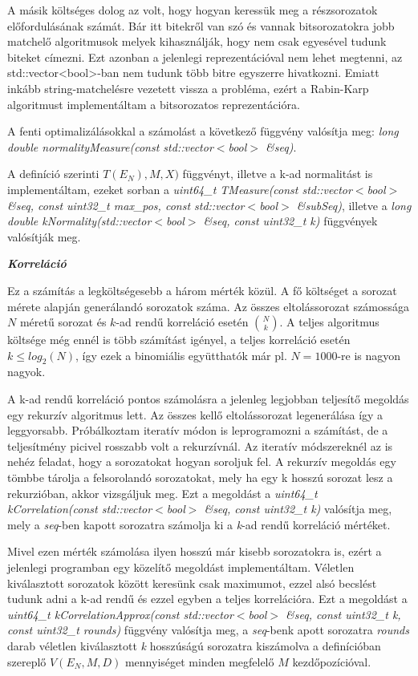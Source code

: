 \documentclass[12pt]{article}
\begin{document}
A másik költséges dolog az volt, hogy hogyan keressük meg a részsorozatok előfordulásának számát. Bár itt bitekről van szó és vannak bitsorozatokra jobb matchelő algoritmusok melyek kihasználják, hogy nem csak egyesével tudunk biteket címezni. Ezt azonban a jelenlegi reprezentációval nem lehet megtenni, az std::vector<bool>-ban nem tudunk több bitre egyszerre hivatkozni. Emiatt inkább string-matchelésre vezetett vissza a probléma, ezért a Rabin-Karp algoritmust implementáltam a bitsorozatos reprezentációra.

A fenti optimalizálásokkal a számolást a következő függvény valósítja meg: \textit{long double normalityMeasure(const std::vector$<$bool$>$ \&seq)}.

A definíció szerinti $T(E_N), M, X)$ függvényt, illetve a k-ad normalitást is implementáltam, ezeket sorban a \textit{uint64\_t TMeasure(const std::vector$<$bool$>$ \&seq, const uint32\_t max\_pos, const std::vector$<$bool$>$ \&subSeq)}, illetve a \textit{long double kNormality(std::vector$<$bool$>$ \&seq, const uint32\_t k)} függvények valósítják meg.

\textit{\textbf{Korreláció}}

Ez a számítás a legköltségesebb a három mérték közül. A fő költséget a sorozat mérete alapján generálandó sorozatok száma. Az összes eltolássorozat számossága $N$ méretű sorozat és $k$-ad rendű korreláció esetén $\binom{N}{k}$. A teljes algoritmus költsége még ennél is több számítást igényel, a teljes korreláció esetén $k \leq log_2(N)$, így ezek a binomiális együtthatók már pl. $N=1000$-re is nagyon nagyok. 

A k-ad rendű korreláció pontos számolásra a jelenleg legjobban teljesítő megoldás egy rekurzív algoritmus lett. Az összes kellő eltolássorozat legenerálása így a leggyorsabb. Próbálkoztam iteratív módon is leprogramozni a számítást, de a teljesítmény picivel rosszabb volt a rekurzívnál. Az iteratív módszereknél az is nehéz feladat, hogy a sorozatokat hogyan soroljuk fel. A rekurzív megoldás egy tömbbe tárolja a felsorolandó sorozatokat, mely ha egy k hosszú sorozat lesz a rekurzióban, akkor vizsgáljuk meg. Ezt a megoldást a \textit{uint64\_t kCorrelation(const std::vector$<$bool$>$ \&seq, const uint32\_t k)} valósítja meg, mely a \textit{seq}-ben kapott sorozatra számolja ki a \textit{k}-ad rendű korreláció mértéket.

Mivel ezen mérték számolása ilyen hosszú már kisebb sorozatokra is, ezért a jelenlegi programban egy közelítő megoldást implementáltam. Véletlen kiválasztott sorozatok között keresünk csak maximumot, ezzel alsó becslést tudunk adni a k-ad rendű és ezzel egyben a teljes korrelációra. Ezt a megoldást a \textit{uint64\_t kCorrelationApprox(const std::vector$<$bool$>$ \&seq, const uint32\_t k, const uint32\_t rounds)} függvény valósítja meg, a \textit{seq}-benk apott sorozatra \textit{rounds} darab véletlen kiválasztott \textit{k} hosszúságú sorozatra kiszámolva a definícióban szereplő $V(E_N, M, D)$ mennyiséget minden megfelelő $M$ kezdőpozícióval.
\end{document}
